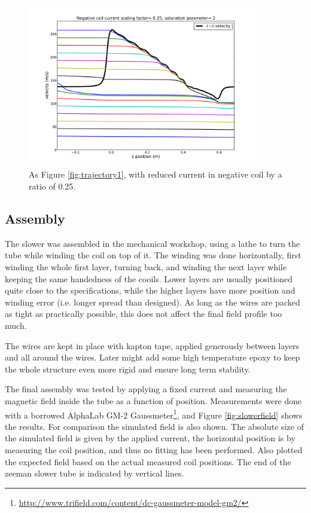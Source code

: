 \documentclass[12pt,a4paper]{article}
\begin{document}
\begin{figure}[htb]
\centering
\includegraphics[width=0.9\textwidth]{trajectory03_3}
\caption{As Figure \ref{fig:trajectory1}, with reduced current in negative coil by a ratio of 0.25.}
\label{fig:trajectory3}
\end{figure}

\subsection{Assembly}

The slower was assembled in the mechanical workshop, using a lathe to turn the tube while winding the coil on top of it. The winding was done horizontally, first winding the whole first layer, turning back, and winding the next layer while keeping the same handedness of the cooils. Lower layers are usually positioned quite close to the specifications, while the higher layers have more position and winding error (i.e. longer spread than designed). As long as the wires are packed as tight as practically possible, this does not affect the final field profile too much.

The wires are kept in place with kapton tape, applied generously between layers and all around the wires. Later might add some high temperature epoxy to keep the whole structure even more rigid and ensure long term stability.

The final assembly was tested by applying a fixed current and measuring the magnetic field inside the tube as a function of position. Measurements were done with a borrowed AlphaLab GM-2 Gaussmeter\footnote{\url{http://www.trifield.com/content/dc-gaussmeter-model-gm2/}}, and Figure \ref{fig:slowerfield} shows the results. For comparison the simulated field is also shown. The absolute size of the simulated field is given by the applied current, the horizontal position is by measuring the coil position, and thus no fitting has been performed. Also plotted the expected field based on the actual measured coil positions. The end of the zeeman slower tube is indicated by vertical lines. 
\end{document}
